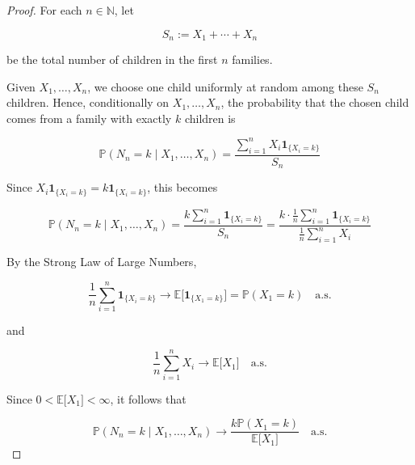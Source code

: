 \begin{proof}

For each \(\mathit{n} \in \mathbb{N}\), let

\[\mathit{S}_{\mathit{n}} := \mathit{X}_{1} + \cdots + \mathit{X}_{\mathit{n}}\]

be the total number of children in the first \(\mathit{n}\) families.

Given \(\mathit{X}_{1},\ldots,\mathit{X}_{\mathit{n}}\), we choose one child uniformly at random among these \(\mathit{S}_{\mathit{n}}\) children. Hence, conditionally on \(\mathit{X}_{1},\ldots,\mathit{X}_{\mathit{n}}\), the probability that the chosen child comes from a family with exactly \(\mathit{k}\) children is

\[\mathbb{P}(\mathit{N}_{\mathit{n}} = \mathit{k} \mid \mathit{X}_{1},\ldots,\mathit{X}_{\mathit{n}}) = \frac{\sum_{\mathit{i} = 1}^{\mathit{n}}\mathit{X}_{\mathit{i}}\mathbf{1}_{\{{\mathit{X}_{\mathit{i}} = \mathit{k}}\}}}{\mathit{S}_{\mathit{n}}}\]

Since \(\mathit{X}_{\mathit{i}}\mathbf{1}_{\{{\mathit{X}_{\mathit{i}} = \mathit{k}}\}} = \mathit{k}\mathbf{1}_{\{{\mathit{X}_{\mathit{i}} = \mathit{k}}\}}\), this becomes

\[\mathbb{P}(\mathit{N}_{\mathit{n}} = \mathit{k} \mid \mathit{X}_{1},\ldots,\mathit{X}_{\mathit{n}}) = \frac{\mathit{k}\sum_{\mathit{i} = 1}^{\mathit{n}}\mathbf{1}_{\{{\mathit{X}_{\mathit{i}} = \mathit{k}}\}}}{\mathit{S}_{\mathit{n}}} = \frac{\mathit{k} \cdot \frac{1}{\mathit{n}}\sum_{\mathit{i} = 1}^{\mathit{n}}\mathbf{1}_{\{{\mathit{X}_{\mathit{i}} = \mathit{k}}\}}}{\frac{1}{\mathit{n}}\sum_{\mathit{i} = 1}^{\mathit{n}}\mathit{X}_{\mathit{i}}}\]

By the Strong Law of Large Numbers,

\[\frac{1}{\mathit{n}}\sum\limits_{\mathit{i} = 1}^{\mathit{n}}\mathbf{1}_{\{{\mathit{X}_{\mathit{i}} = \mathit{k}}\}}\rightarrow\mathbb{E}\lbrack\mathbf{1}_{\{{\mathit{X}_{1} = \mathit{k}}\}}\rbrack = \mathbb{P}(\mathit{X}_{1} = \mathit{k})\quad\text{a.s.}\]

and

\[\frac{1}{\mathit{n}}\sum\limits_{\mathit{i} = 1}^{\mathit{n}}\mathit{X}_{\mathit{i}}\rightarrow\mathbb{E}\lbrack\mathit{X}_{1}\rbrack\quad\text{a.s.}\]

Since \(0 < \mathbb{E}\lbrack\mathit{X}_{1}\rbrack < \infty\), it follows that

\[\mathbb{P}(\mathit{N}_{\mathit{n}} = \mathit{k} \mid \mathit{X}_{1},\ldots,\mathit{X}_{\mathit{n}})\rightarrow\frac{\mathit{k}\mathbb{P}(\mathit{X}_{1} = \mathit{k})}{\mathbb{E}\lbrack\mathit{X}_{1}\rbrack}\quad\text{a.s.}\]


\end{proof}
